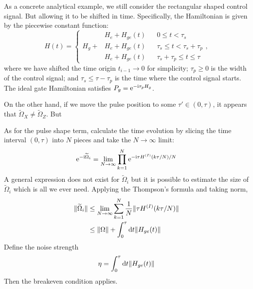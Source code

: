 \documentclass[b5paper,11pt]{article}
\newcommand{\wt}[1]{\widetilde{#1}}
\begin{document}
As a concrete analytical example, we still consider the rectangular shaped control signal. But allowing it to be shifted in time. Specifically, the Hamiltonian is given by the piecewise constant function:
\begin{equation}
 H(t) = 
    \left\{
 \begin{aligned}
 &H_e + H_{ge}(t) && 0\le t < \tau_s\\
H_g +{} & H_e + H_{ge}(t) && \tau_s \le t < \tau_s+\tau_p\\
& H_e + H_{ge}(t) &&  \tau_s+\tau_p \le t \le \tau
 \end{aligned}
    \right.,
\end{equation}
where we have shifted the time origin $t_{i-1}\to 0$ for simplicity; 
$\tau_p\ge 0$ is the width of the control signal; and
$\tau_s \le \tau -\tau_p $ is the time where the control signal starts.
The ideal gate Hamiltonian satisfies $P_g = \mathrm{e}^{-\mathrm{i} \tau_p H_g }$.


On the other hand, if we move the pulse position to some $\tau'\in(0,\tau)$, it appears that $\wt \Omega_X \neq \wt \Omega_Z$. But 



As for the pulse shape term, 
calculate the time evolution by slicing the time interval $(0,\tau)$ into $N$ pieces and take the $N\to\infty$ limit:
\begin{equation}
 \upe^{-\upi \wt \Omega_i} = \lim_{N\to\infty} \prod_{k=1}^N 
 \upe^{-\upi \tau H\up{I}(k \tau/N)/N}
\end{equation}
A general expression does not exist for $\wt \Omega_i$ but it is possible to estimate the size of $\wt \Omega_i$ which is all we ever need. 
Applying the Thompson's formula and taking norm, 
\begin{equation}
\begin{split}
 \norm{\wt \Omega_i} &\le \lim_{N\to\infty}\sum_{k=1}^N \frac{1}{N} \norm{\tau H\up{I}(k \tau/N)}\\
 &\le \norm{\Omega} + \int_0^\tau \dd t \norm{H_{ge}(t)}
\end{split}
\end{equation}
Define the noise strength
\begin{equation}
\eta =  \int_0^\tau \mathop{}\!\mathrm{d} t \Vert {H_{ge}(t)} \Vert
\end{equation}
Then the breakeven condition applies.
\end{document}
